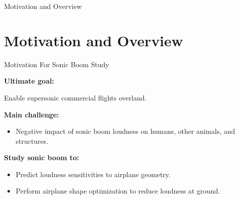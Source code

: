\documentclass{beamer}
\newcounter{sectionframes}
\newcommand{\setsectionframes}[1]{%
  \setcounter{sectionframes}{#1}%
}
\newcounter{sectionframecount}
\begin{document}
\begin{frame}[plain]
  \vfill
  \centering
  {Motivation and Overview}
  \vfill
\end{frame}


\section{Motivation and Overview}

\setsectionframes{5}


\begin{frame}[t]{Motivation For Sonic Boom Study}
  \vspace{-5pt}
  \begin{minipage}[t]{0.55\linewidth}
    \textbf{Ultimate goal:}

    Enable supersonic commercial flights overland.

    \vspace{10pt}
    \textbf{Main challenge:}

    \begin{itemize}
      \item Negative impact of sonic boom loudness on humans, other animals, and structures.
    \end{itemize}

    \vspace{10pt}
    \textbf{Study sonic boom to:}
    \begin{itemize}
      \item Predict loudness sensitivities to airplane geometry.
      \item Perform airplane shape optimization to reduce loudness at ground.
    \end{itemize}
  \end{minipage}



\end{frame}
\end{document}
